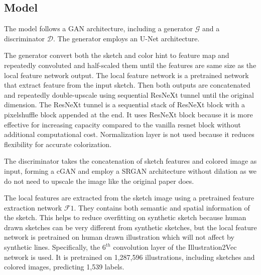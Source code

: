 \subsection{Model}


The model follows a GAN architecture, including a generator $\mathcal{G}$ and a discriminator $\mathcal{D}$. The generator employs an U-Net\cite{ronnebergerUNetConvolutionalNetworks2015} architecture.

The generator convert both the sketch and color hint to feature map and repeatedly convoluted and half-scaled them until the features are same size as the local feature network output. The local feature network is a pretrained network that extract feature from the input sketch. Then both outputs are concatenated and repeatedly double-upscale using sequential ResNeXt tunnel until the original dimension. The ResNeXt tunnel is a sequential stack of ResNeXt block\cite{xieAggregatedResidualTransformations2017a} with a pixelshuffle block\cite{shiRealTimeSingleImage2016} appended at the end. It uses ResNeXt block because it is more effective for increasing capacity compared to the vanilla resnet block without additional computational cost. Normalization layer is not used because it reduces flexibility for accurate colorization\cite{nahDeepMultiscaleConvolutional2018}.

The discriminator takes the concatenation of sketch features and colored image as input, forming a cGAN\cite{mirzaConditionalGenerativeAdversarial2014} and employ a SRGAN\cite{ledigPhotoRealisticSingleImage2017} architecture without dilation as we do not need to upscale the image like the original paper does.

The local features are extracted from the sketch image using a pretrained feature extraction network $\mathcal{F}1$. They contains both semantic and spatial information of the sketch. This helps to reduce overfitting on synthetic sketch because human drawn sketches can be very different from synthetic sketches, but the local feature network is pretrained on human drawn illustration which will not affect by synthetic lines. Specifically, the $6^{th}$ convolution layer of the Illustration2Vec\cite{saitoIllustration2VecSemanticVector2015} network is used. It is pretrained on 1,287,596 illustrations, including sketches and colored images, predicting 1,539 labels.

